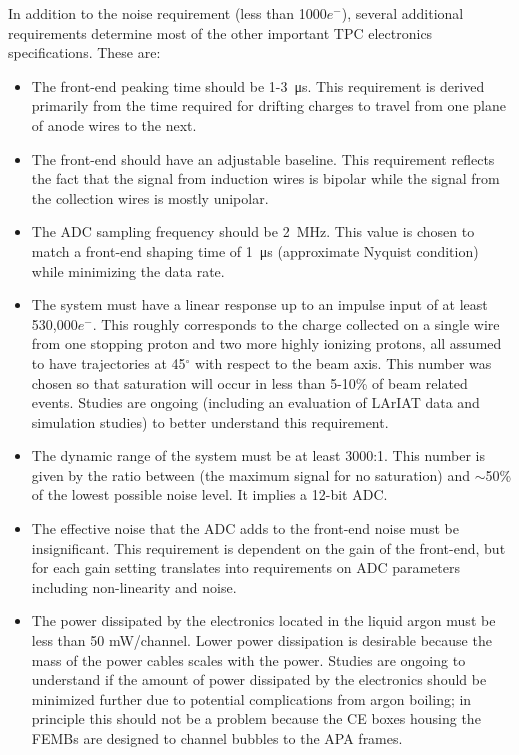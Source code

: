 In addition to the noise requirement (less than 1000$e^{-}$), several additional requirements determine most of the other important TPC electronics specifications.  These are:

\begin{itemize}
\item{The front-end peaking time should be 1-3~\si{\micro\second}.  This requirement is derived primarily from the time required for drifting charges to travel from one plane of anode wires to the next.}
\item{The front-end should have an adjustable baseline.  This requirement reflects the fact that the signal from induction wires is bipolar while the signal from the collection wires is mostly unipolar.}
\item{The ADC sampling frequency should be 2~MHz.  This value is chosen to match a front-end shaping time of 1~\si{\micro\second} (approximate Nyquist condition) while minimizing the data rate.}
\item{The system must have a linear response up to an impulse input of at least 530,000$e^{-}$.  This roughly corresponds to the charge collected on a single wire from one stopping proton and two more highly ionizing protons, all assumed to have trajectories at 45$^{\circ}$ with respect to the beam axis.  This number was chosen so that saturation will occur in less than 5-10\% of beam related events.  Studies are ongoing (including an evaluation of LArIAT data and simulation studies) to better understand this requirement.}
\item{The dynamic range of the system must be at least 3000:1. This number is given by the ratio between (the maximum signal for no saturation) and $\sim$50\% of the lowest possible noise level.  It implies a 12-bit ADC.}
\item{The effective noise that the ADC adds to the front-end noise must be insignificant.  This requirement is dependent on the gain of the front-end, but for each gain setting translates into requirements on ADC parameters including non-linearity and noise.}
\item{The power dissipated by the electronics located in the liquid argon must be less than 50 mW/channel.  Lower power dissipation is desirable because the mass of the power cables scales with the power.  Studies are ongoing to understand if the amount of power dissipated by the electronics should be minimized further due to potential complications from argon boiling; in principle this should not be a problem because the CE boxes housing the FEMBs are designed to channel bubbles to the APA frames.}
\end{itemize}

